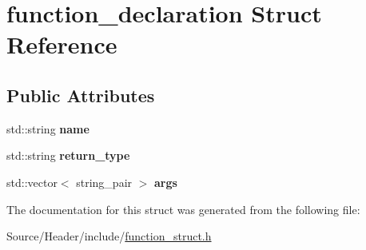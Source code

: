 \hypertarget{structfunction__declaration}{\section{function\-\_\-declaration Struct Reference}
\label{structfunction__declaration}
}
\subsection*{Public Attributes}
\begin{DoxyCompactItemize}
\item 
\hypertarget{structfunction__declaration_a021e9860ca12c3e2835cb21fb4677530}{std\-::string {\bfseries name}}\label{structfunction__declaration_a021e9860ca12c3e2835cb21fb4677530}

\item 
\hypertarget{structfunction__declaration_ae295213d638ea6572a89ccae425476b2}{std\-::string {\bfseries return\-\_\-type}}\label{structfunction__declaration_ae295213d638ea6572a89ccae425476b2}

\item 
\hypertarget{structfunction__declaration_a3e63bb2cf2ed0dd5089fffb8bdee043e}{std\-::vector$<$ string\-\_\-pair $>$ {\bfseries args}}\label{structfunction__declaration_a3e63bb2cf2ed0dd5089fffb8bdee043e}

\end{DoxyCompactItemize}


The documentation for this struct was generated from the following file\-:\begin{DoxyCompactItemize}
\item 
Source/\-Header/include/\hyperlink{function__struct_8h}{function\-\_\-struct.\-h}\end{DoxyCompactItemize}
